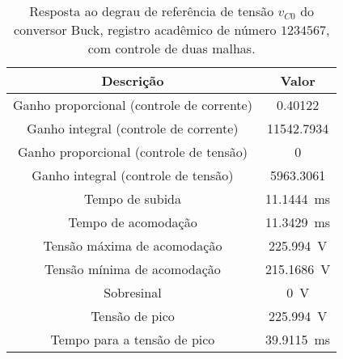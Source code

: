 \begin{table}[!ht]
\centering
\caption{Resposta ao degrau de referência de tensão $v_{C0}$ do conversor Buck, registro acadêmico de número $1234567$, com controle de duas malhas.}
\label{tab:resposta2malhas}
\begin{tabular}{@{}cc@{}}
\toprule
\textbf{Descrição} & \textbf{Valor}\\ \midrule
Ganho proporcional (controle de corrente) & \SI{0.40122}{}\\
Ganho integral (controle de corrente) & \SI{11542.7934}{}\\
Ganho proporcional (controle de tensão) & \SI{0}{}\\
Ganho integral (controle de tensão) & \SI{5963.3061}{}\\
Tempo de subida & \SI{11.1444}{\milli\s}\\
Tempo de acomodação & \SI{11.3429}{\milli\s}\\
Tensão máxima de acomodação & \SI{225.994}{\V}\\
Tensão mínima de acomodação & \SI{215.1686}{\V}\\
Sobresinal & \SI{0}{\V}\\
Tensão de pico & \SI{225.994}{\V}\\
Tempo para a tensão de pico & \SI{39.9115}{\milli\s}\\
\bottomrule
\end{tabular}
\end{table}

